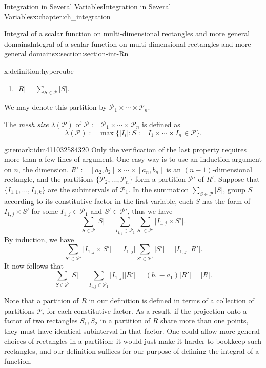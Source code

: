 \documentclass[oneside,10pt,]{book}
\newcommand{\cP}{\mathcal{P}}
\begin{document}
\begin{chapterptx}{Integration in Several Variables}{}{Integration in Several Variables}{}{}{x:chapter:ch_integration}
\begin{sectionptx}{Integral of a scalar function on multi-dimensional rectangles and more general domains}{}{Integral of a scalar function on multi-dimensional rectangles and more general domains}{}{}{x:section:section-int-Rn}
\begin{definition}{}{x:definition:hypercube}
\begin{enumerate}[label=(\roman*).]
\item{}\(\vert R\vert=\sum_{S\in \cP}\vert S\vert\).%
\end{enumerate}
We may denote this partition by \(\cP_{1}\times\cdots \times \cP_{n}\).%
\par
The \emph{mesh size} \(\lambda(\cP)\) of \(\cP:=\cP_{1}\times\cdots \times \cP_{n}\) is defined as%
\begin{equation*}
\lambda(\cP) :=\max\{\vert I_{i}\vert: S:=I_{1}\times\cdots\times I_{n} \in \cP\}.
\end{equation*}
%
\end{definition}
\begin{remark}{}{g:remark:idm411032584320}%
Only the verification of the last property requires more than a few lines of argument. One easy way is to use an induction argument on \(n\), the dimension. \(R':=[a_{2}, b_{2}]\times \cdots \times [a_{n}, b_{n}]\) is an \((n-1)\)-dimensional rectangle, and the partitions \(\{\cP_{2},\ldots, \cP_{n}\}\) form a partition \(\cP'\) of \(R'\). Suppose that \(\{I_{1,1},\ldots, I_{1,k}\}\) are the subintervals of \(\cP_{1}\). In the summation \(\sum_{S\in \cP}\vert S\vert\), group \(S\) according to its constitutive factor in the first variable, each \(S\) has the form of \(I_{1,j}\times S'\) for some \(I_{1,j}\in \cP_{1}\) and \(S'\in \cP'\), thus we have%
\begin{equation*}
\sum_{S\in \cP}\vert S\vert=\sum_{I_{1,j}\in \cP_{1}}\sum_{S'\in \cP'}
\vert I_{1,j} \times S'\vert.
\end{equation*}
By induction, we have%
\begin{equation*}
\sum_{S'\in \cP'}
\vert I_{1,j} \times S'\vert= \vert I_{1,j}\vert \sum_{S'\in \cP'}
\vert  S'\vert= \vert I_{1,j}\vert \vert R'\vert.
\end{equation*}
It now follows that%
\begin{equation*}
\sum_{S\in \cP}\vert S\vert=\sum_{I_{1,j}\in \cP_{1}} \vert I_{1,j}\vert \vert R'\vert
=(b_{1}-a_{1})  \vert R'\vert=\vert R\vert.
\end{equation*}
%
\par
Note that a partition of \(R\) in our definition is defined in terms of a collection of partitions \(\cP_{i}\) for each constitutive factor. As a result, if the projection onto a factor of two rectangles \(S_{1}, S_{2}\) in  a partition of \(R\) share more than one points, they must have identical subinterval in that factor. One could allow more general choices of rectangles in a partition; it would just make it harder to bookkeep such rectangles, and our definition suffices for our purpose of defining the integral of a function.%

\end{remark}
\end{sectionptx}
\end{chapterptx}
\end{document}

